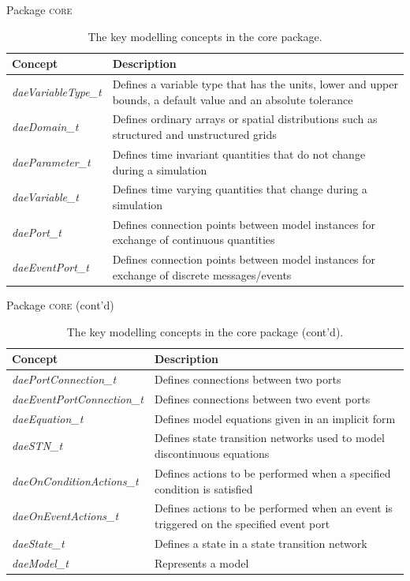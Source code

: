 \documentclass[compress,newPxFont,sthlmFooter]{beamer}
\begin{document}
\begin{frame}{Package \textsc{core}}
\scriptsize
{
\begin{table}
  \caption*{The key modelling concepts in the \alert{core} package.}
  \begin{tabularx}{\linewidth}{l>{\raggedright}X}
    \toprule
    \textcolor{sthlmRed}{\textbf{Concept}} & \textcolor{sthlmRed}{\textbf{Description}} \tabularnewline
    \midrule
    \textcolor{sthlmRed}{\textit{daeVariableType\_t}} & Defines a variable type that has the units, lower and upper bounds, a default value and 
                                  an absolute tolerance \tabularnewline
    \textcolor{sthlmRed}{\textit{daeDomain\_t}} & Defines ordinary arrays or spatial distributions such as structured and unstructured grids \tabularnewline 
    \textcolor{sthlmRed}{\textit{daeParameter\_t}} & Defines time invariant quantities that do not change during a simulation \tabularnewline 
    \textcolor{sthlmRed}{\textit{daeVariable\_t}} & Defines time varying quantities that change during a simulation \tabularnewline 
    \textcolor{sthlmRed}{\textit{daePort\_t}} & Defines connection points between model instances for exchange of continuous quantities \tabularnewline 
    \textcolor{sthlmRed}{\textit{daeEventPort\_t}} & Defines connection points between model instances for exchange of discrete messages/events \tabularnewline
    \bottomrule
  \end{tabularx}
\end{table}
}
\end{frame}

\begin{frame}{Package \textsc{core} (cont'd)}
\scriptsize
{
\begin{table}
  \caption*{The key modelling concepts in the \alert{core} package (cont'd).}
  \begin{tabularx}{\linewidth}{l>{\raggedright}X}
    \toprule
    \textcolor{sthlmRed}{\textbf{Concept}} & \textcolor{sthlmRed}{\textbf{Description}} \tabularnewline
    \midrule
    \textcolor{sthlmRed}{\textit{daePortConnection\_t}} & Defines connections between two ports \tabularnewline 
    \textcolor{sthlmRed}{\textit{daeEventPortConnection\_t}} & Defines connections between two event ports \tabularnewline
    \textcolor{sthlmRed}{\textit{daeEquation\_t}} & Defines model equations given in an implicit form \tabularnewline 
    \textcolor{sthlmRed}{\textit{daeSTN\_t}} & Defines state transition networks used to model discontinuous equations \tabularnewline
    \textcolor{sthlmRed}{\textit{daeOnConditionActions\_t}} & Defines actions to be performed when a specified condition is satisfied \tabularnewline
    \textcolor{sthlmRed}{\textit{daeOnEventActions\_t}} & Defines actions to be performed when an event is triggered on the specified event port \tabularnewline
    \textcolor{sthlmRed}{\textit{daeState\_t}} & Defines a state in a state transition network \tabularnewline 
    \textcolor{sthlmRed}{\textit{daeModel\_t}} & Represents a model \tabularnewline
    \bottomrule
  \end{tabularx}
\end{table}
}
\end{frame}
\end{document}
